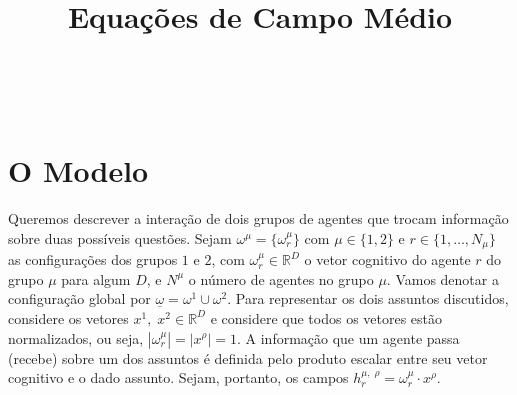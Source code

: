 \documentclass[a4paper, 11pt]{article} %
\title{\textbf{Equações de Campo Médio}}%
\makeatletter
\renewcommand{\maketitle}{ %
\begin{flushright} %
{\LARGE\@title} %

\vspace{50pt} %

{\large\@author} %
\\\@date %

\vspace{40pt} %
\end{flushright}
}
\newcommand{\agent}[2]{%
    \omega^{#2}_{#1}}
\newcommand{\conf}{%
    \underline \omega}
\newcommand{\opn}[2]{\ensuremath{\displaystyle%
    h^{#2,\;\rho}_{#1}}}
\makeatother
\begin{document}
\maketitle %




\vspace{30pt} %


\section*{O Modelo}

Queremos descrever a interação de dois grupos de agentes que trocam informação
sobre duas possíveis questões. Sejam $ \omega^{\mu}=\{\agent{r}{\mu}\} $ com 
$ \mu \in \{1,2\} $ e $r \in \{1,\ldots, N_{\mu}\}$ as configurações dos grupos
$1$ e $2$, com $\agent{r}{\mu} \in \mathbb{R}^D$ o vetor cognitivo do agente $r$
do grupo $\mu$ para algum $D$, e $N^{\mu}$ o número de agentes no grupo $\mu$.
Vamos denotar a configuração global por
$\conf = \omega^1 \cup \omega^2$. Para representar os
dois assuntos discutidos, considere os vetores $x^1,\;x^2 \in \mathbb{R}^D$ e
considere que todos os vetores estão normalizados, ou seja, 
$|\agent{r}{\mu}|=|x^{\rho}|=1$. A informação que um agente passa (recebe) sobre 
um dos assuntos é definida pelo produto escalar entre seu vetor cognitivo e o 
dado assunto. Sejam, portanto, os campos 
$\opn{r}{\mu}=\agent{r}{\mu} \cdot x^{\rho}$.  
\end{document}
